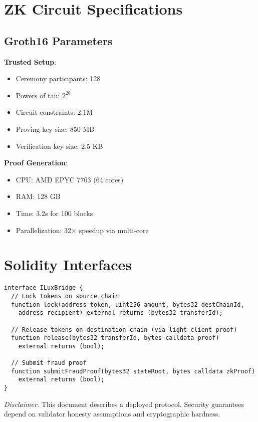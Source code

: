 \documentclass[11pt]{article}
\begin{document}
\appendix

\section{ZK Circuit Specifications}

\subsection{Groth16 Parameters}

\textbf{Trusted Setup}:
\begin{itemize}[leftmargin=1.1em]
  \item Ceremony participants: 128
  \item Powers of tau: $2^{20}$
  \item Circuit constraints: 2.1M
  \item Proving key size: 850 MB
  \item Verification key size: 2.5 KB
\end{itemize}

\textbf{Proof Generation}:
\begin{itemize}[leftmargin=1.1em]
  \item CPU: AMD EPYC 7763 (64 cores)
  \item RAM: 128 GB
  \item Time: 3.2s for 100 blocks
  \item Parallelization: 32× speedup via multi-core
\end{itemize}

\section{Solidity Interfaces}

\begin{verbatim}
interface ILuxBridge {
  // Lock tokens on source chain
  function lock(address token, uint256 amount, bytes32 destChainId,
    address recipient) external returns (bytes32 transferId);

  // Release tokens on destination chain (via light client proof)
  function release(bytes32 transferId, bytes calldata proof)
    external returns (bool);

  // Submit fraud proof
  function submitFraudProof(bytes32 stateRoot, bytes calldata zkProof)
    external returns (bool);
}
\end{verbatim}

\vspace{1em}
\noindent\textit{Disclaimer.} This document describes a deployed protocol. Security guarantees depend on validator honesty assumptions and cryptographic hardness.
\end{document}
